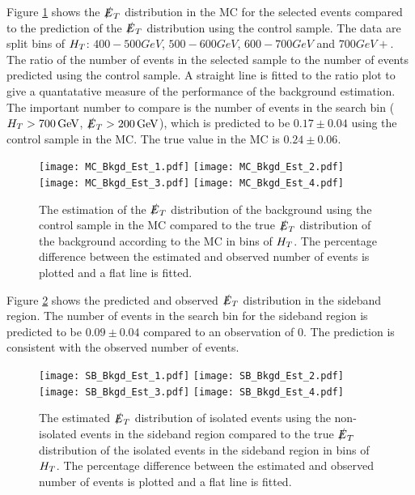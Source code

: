 Figure \ref{fig:Bkgd_Est_MC} shows the $\slashed{E}_{T}$ distribution in the MC for the 
selected events compared to the prediction of the $\slashed{E}_{T}$ distribution using the 
control sample. The data are split bins of $H_{T}$: $400-500\unit{GeV}$, 
$500-600\unit{GeV}$, $600-700\unit{GeV}$ and $700\unit{GeV}+$. The ratio of the 
number of events in the selected sample to the number of events predicted using 
the control sample. A straight line is fitted to the ratio plot to give a 
quantatative measure of the performance of the background estimation. The 
important number to compare is the number of events in the search bin
($H_{T}>700\, \mathrm{GeV}$, $\slashed{E}_{T}>200\, \mathrm{GeV}$), which is predicted to be 
$0.17\pm0.04$ using the control sample in the MC. The true value in the MC is 
$0.24\pm0.06$. \\

\begin{figure}
\texttt{[image: MC\_Bkgd\_Est\_1.pdf]}
\texttt{[image: MC\_Bkgd\_Est\_2.pdf]}\\
\texttt{[image: MC\_Bkgd\_Est\_3.pdf]}
\texttt{[image: MC\_Bkgd\_Est\_4.pdf]}\\
\caption{The estimation of the $\slashed{E}_{T}$ distribution of the background using the
control sample in the MC compared to the true $\slashed{E}_{T}$ distribution of the 
background according to the MC in bins of $H_{T}$. The percentage difference 
between the estimated and observed number of events is plotted and a flat line 
is fitted.}
\label{fig:Bkgd_Est_MC}
\end{figure}

Figure \ref{fig:Bkgd_Est_Sideband} shows the predicted and observed $\slashed{E}_{T}$ 
distribution in the sideband region. The number of events in the search bin for
the sideband region is predicted to be $0.09\pm0.04$ compared to an observation of
0. The prediction is consistent with the observed number of events. \\

\begin{figure}
\texttt{[image: SB\_Bkgd\_Est\_1.pdf]}
\texttt{[image: SB\_Bkgd\_Est\_2.pdf]}\\
\texttt{[image: SB\_Bkgd\_Est\_3.pdf]}
\texttt{[image: SB\_Bkgd\_Est\_4.pdf]}\\
\caption{The estimated $\slashed{E}_{T}$ distribution of isolated events using the
non-isolated events in the sideband region compared to the true $\slashed{E}_{T}$
distribution of the isolated events in the sideband region in bins of $H_{T}$. The 
percentage difference between the estimated and observed number of events is 
plotted and a flat line is fitted.}
\label{fig:Bkgd_Est_Sideband}
\end{figure}

